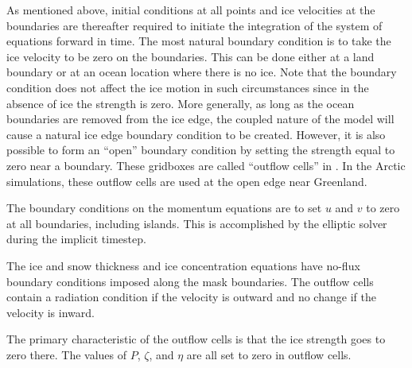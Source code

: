 As mentioned above, initial conditions at all points and ice
velocities at the boundaries are thereafter required to initiate the
integration of the system of equations forward in time.  The most
natural boundary condition is to take the ice velocity to be zero on
the boundaries.  This can be done either at a land boundary or at an
ocean location where there is no ice.  Note that the boundary
condition does not affect the ice motion in such circumstances since
in the absence of ice the strength is zero.  More generally, as long
as the ocean boundaries are removed from the ice edge, the coupled
nature of the model will cause a natural ice edge boundary condition
to be created.  However, it is also possible to form an ``open''
boundary condition by setting the strength equal to zero near a
boundary.  These gridboxes are called ``outflow cells'' in
\citet{Hibler79}.  In the Arctic simulations, these outflow cells
are used at the open edge near Greenland.

The boundary conditions on the momentum equations are to set $u$ and $v$
to zero at all boundaries, including islands.  This is accomplished
by the elliptic solver during the implicit timestep.

The ice and snow thickness and ice concentration equations have no-flux
boundary conditions imposed along the mask boundaries.  The outflow
cells contain a radiation condition if the velocity is outward and no
change if the velocity is inward.

The primary characteristic of the outflow cells is that the ice
strength goes to zero there.  The values of $P$, $\zeta$, and $\eta$
are all set to zero in outflow cells.
